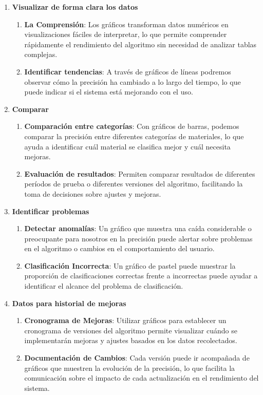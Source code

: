 \begin{enumerate}
    \item \textbf{Visualizar de forma clara los datos}
    \begin{enumerate}
        \item \textbf{La Comprensión}: Los gráficos transforman datos numéricos en visualizaciones fáciles de interpretar, lo que permite comprender rápidamente el rendimiento del algoritmo sin necesidad de analizar tablas complejas.
        \item \textbf{Identificar tendencias}: A través de gráficos de líneas podremos observar cómo la precisión ha cambiado a lo largo del tiempo, lo que puede indicar si el sistema está mejorando con el uso.
    \end{enumerate}
    
    \item \textbf{Comparar}
    \begin{enumerate}
        \item \textbf{Comparación entre categorías}: Con gráficos de barras, podemos comparar la precisión entre diferentes categorías de materiales, lo que ayuda a identificar cuál material se clasifica mejor y cuál necesita mejoras.
        \item \textbf{Evaluación de resultados}: Permiten comparar resultados de diferentes períodos de prueba o diferentes versiones del algoritmo, facilitando la toma de decisiones sobre ajustes y mejoras.
    \end{enumerate}

    \item \textbf{Identificar problemas}
    \begin{enumerate}
        \item \textbf{Detectar anomalías}: Un gráfico que muestra una caída considerable o preocupante para nosotros en la precisión puede alertar sobre problemas en el algoritmo o cambios en el comportamiento del usuario.
        \item \textbf{Clasificación Incorrecta}: Un gráfico de pastel puede muestrar la proporción de clasificaciones correctas frente a incorrectas puede ayudar a identificar el alcance del problema de clasificación.
    \end{enumerate}

    \item \textbf{Datos para historial de mejoras}
    \begin{enumerate}
        \item \textbf{Cronograma de Mejoras}: Utilizar gráficos para establecer un cronograma de versiones del algoritmo permite visualizar cuándo se implementarán mejoras y ajustes basados en los datos recolectados.
        \item \textbf{Documentación de Cambios}: Cada versión puede ir acompañada de gráficos que muestren la evolución de la precisión, lo que facilita la comunicación sobre el impacto de cada actualización en el rendimiento del sistema.
    \end{enumerate}

\end{enumerate}
